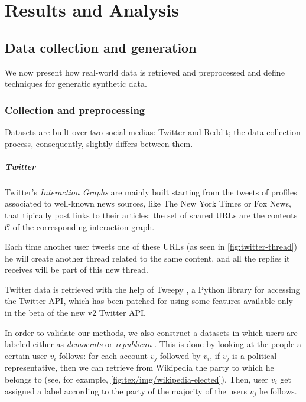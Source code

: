 \chapter{Results and Analysis}
\label{ch:resultsAndAnalysis}

\section{Data collection and generation}%
\label{sec:data_collection_and_generation}

We now present how real-world data is retrieved and preprocessed and
define techniques for generatic synthetic data.

\subsection{Collection and preprocessing}%
\label{sub:collection_and_preprocessing}

Datasets are built over two social medias: Twitter and Reddit; the data
collection process, consequently, slightly differs between them.

\paragraph{Twitter}%
\label{par:twitter-data}

Twitter's \emph{Interaction Graphs} are mainly built starting from the tweets
of profiles associated to well-known news sources, like The
New York Times or Fox News, that tipically post links to their articles:
the set of shared URLs are the contents $\mathcal{C} $ of the corresponding interaction graph.

Each time another user tweets one of these URLs (as seen in
\autoref{fig:twitter-thread}) he
will create another thread related to the same content, and all the
replies it receives will be part of this new thread.

Twitter data is retrieved with the help of Tweepy \cite{tweepy}, a Python
library for accessing the Twitter API, which has been patched for using some
features available only in the beta of the new v2 Twitter API.

In order to validate our methods, we also construct a datasets in which users are labeled either as
\emph{democrats} or \emph{republican} \footnotemark. This is done by looking at the people a
certain user $v_i$ follows: for each account $v_j$ followed by $v_i$, if $v_j$ is a political representative, then we can
retrieve from Wikipedia the party to which he belongs to (see, for
example, \autoref{fig:tex/img/wikipedia-elected}). Then, user $v_i$ get assigned a
label according to the party of the majority of the users $v_j$ he
follows.

